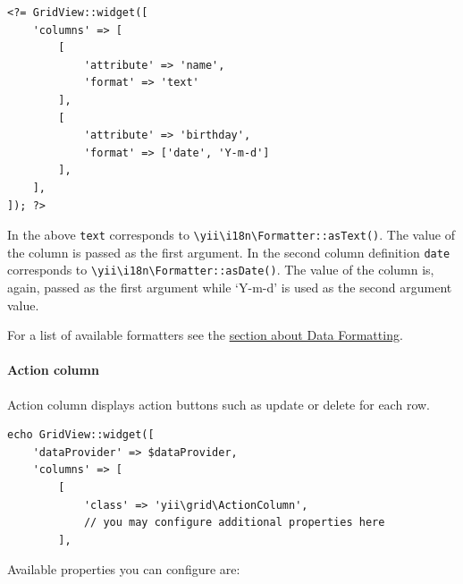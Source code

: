 \lstset{language=php}\begin{lstlisting}
<?= GridView::widget([
    'columns' => [
        [
            'attribute' => 'name',
            'format' => 'text'
        ],
        [
            'attribute' => 'birthday',
            'format' => ['date', 'Y-m-d']
        ],
    ],
]); ?>
\end{lstlisting}
In the above \lstinline|text| corresponds to \texttt{{\allowbreak{}\textbackslash}yii{\allowbreak{}\textbackslash}i18n{\allowbreak{}\textbackslash}Formatter\allowbreak{}::\allowbreak{}asText()}. The value of the column is passed as the first
argument. In the second column definition \lstinline|date| corresponds to \texttt{{\allowbreak{}\textbackslash}yii{\allowbreak{}\textbackslash}i18n{\allowbreak{}\textbackslash}Formatter\allowbreak{}::\allowbreak{}asDate()}. The value of the
column is, again, passed as the first argument while `Y-m-d' is used as the second argument value.

For a list of available formatters see the \hyperref[output-formatter.md]{section about Data Formatting}.

\paragraph{Action column}
Action column displays action buttons such as update or delete for each row.

\lstset{language=php}\begin{lstlisting}
echo GridView::widget([
    'dataProvider' => $dataProvider,
    'columns' => [
        [
            'class' => 'yii\grid\ActionColumn',
            // you may configure additional properties here
        ],
\end{lstlisting}
Available properties you can configure are:

